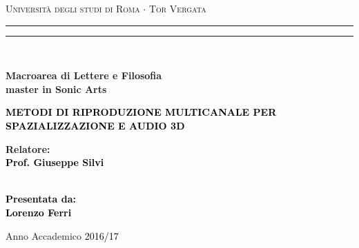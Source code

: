 \documentclass[12pt,a4paper]{report}
\begin{document}
\begin{titlepage}
\begin{center}
{\Large{\textsc{Università degli studi di Roma  $\cdot$ Tor Vergata}}} 
\rule[0.1cm]{15.8cm}{0.1mm}
\rule[0.5cm]{15.8cm}{0.6mm}
\\\vspace{3mm}

{\small{\bf Macroarea di Lettere e Filosofia \\ master in Sonic Arts}}

\end{center}

\vspace{23mm}

\begin{center}
\begin{spacing}{1.7}
\textcolor{black}{
\linespread{5}
{\LARGE{\bf 
METODI DI RIPRODUZIONE MULTICANALE PER SPAZIALIZZAZIONE E AUDIO 3D}}}
\end{spacing}
\end{center}

\vspace{50mm} \par \noindent

\begin{minipage}[t]{0.47\textwidth}

{\large{\bf Relatore: \vspace{2mm}\\\textcolor{black}{
Prof. Giuseppe Silvi}\\\\

}
}
\end{minipage}
%
\hfill
%
\begin{minipage}[t]{0.47\textwidth}\raggedleft \textcolor{black}{
{\large{\bf Presentata da:
\vspace{2mm}\\
%
%
Lorenzo Ferri}}}
\end{minipage}

\vspace{17mm}

\begin{center}

{\large{%

Anno Accademico \textcolor{black}{2016/17}}}
\end{center}

\newpage\null\thispagestyle{empty}

\end{titlepage}
\end{document}
